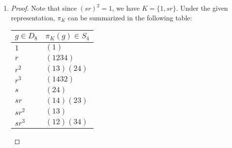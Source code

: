 \documentclass{article}
\begin{document}
\begin{enumerate}
\begin{enumerate}
\begin{proof}
\begin{align*}
                      &= (23)\pi_H(g)(23).
          \end{align*}
          Hence from the above table for $\pi_H$ we obtain the following
          table for $\pi_H'$:
          \begin{center}
            \begin{tabular}{|l|l|}
              \hline
              $g\in D_8$ & $\pi_H'(g)\in S_4$ \\
              \hline\hline
              $1$     & $(1)$ \\
              $r$     & $(1324)$ \\
              $r^2$   & $(12)(34)$ \\
              $r^3$   & $(1423)$ \\
              $s$     & $(34)$ \\
              $sr$    & $(14)(23)$ \\
              $sr^2$  & $(12)$ \\
              $sr^3$  & $(13)(24)$ \\
              \hline
            \end{tabular}
          \end{center}
        The subgroup $\pi_H'$ is different from $\pi_H$ since
        $(12)\in Im(\pi_H')$ but $(12)\not\in Im(\pi_H)$.
        \end{proof}
      \item
        \begin{proof}
          Note that since $(sr)^2=1$, we have $K=\{1,sr\}$. Under the given
          representation, $\pi_K$ can be summarized in the following table:
          \begin{center}
            \begin{tabular}{|l|l|}
              \hline
              $g\in D_8$ & $\pi_K(g)\in S_4$ \\
              \hline\hline
              $1$     & $(1)$ \\
              $r$     & $(1234)$ \\
              $r^2$   & $(13)(24)$ \\
              $r^3$   & $(1432)$ \\
              $s$     & $(24)$ \\
              $sr$    & $(14)(23)$ \\
              $sr^2$  & $(13)$ \\
              $sr^3$  & $(12)(34)$ \\
              \hline
            \end{tabular}
          \end{center}
        \end{proof}
    \end{enumerate}
\end{enumerate}
\end{document}
